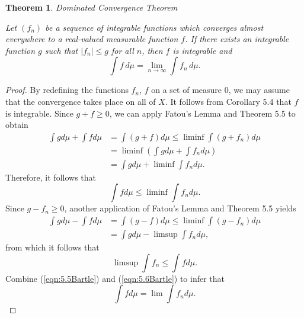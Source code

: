 \documentclass[12pt]{amsart}
\theoremstyle{plain}
\newtheorem{thm}{Theorem}[section]
\theoremstyle{definition}
\theoremstyle{remark}
\numberwithin{equation}{section}
\numberwithin{thm}{section}
\begin{document}
\begin{thm}{Dominated Convergence Theorem}

Let \((f_n)\) be a sequence of integrable functions which converges almost everywhere to a real-valued measurable function \(f\). If there exists an integrable function \(g\) such that \(|f_n| \leq g\) for all \(n\), then \(f\) is integrable and 
\[
\int f \, d\mu = \lim_{n \to \infty} \int f_n \, d\mu.
\]
\end{thm}
\begin{proof}
    By redefining the functions $f_n$, $f$ on a set of measure 0, we may assume that the convergence takes place on all of $X$. It follows from Corollary 5.4 that $f$ is integrable. Since $g+f \geq 0$, we can apply Fatou's Lemma and Theorem 5.5 to obtain
    \begin{equation*}
        \begin{aligned}
           \int g d\mu + \int f d\mu &= \int (g+f) d\mu \leq \liminf \int (g+f_n)d\mu \\
           & = \liminf(\int g d\mu + \int f_n d\mu) \\
           & = \int g d\mu + \liminf \int f_n d\mu.            
        \end{aligned}
    \end{equation*}
    Therefore, it follows that
    \begin{equation} \label{eqn:5.5Bartle}
        \int f d\mu \leq \liminf \int f_n d\mu. 
    \end{equation}
    Since $g-f_n \geq 0$, another application of Fatou's Lemma and Theorem 5.5 yields
    \begin{equation*}
        \begin{aligned}
            \int g d\mu - \int f d\mu & = \int (g-f) d\mu \leq \liminf \int (g-f_n)d\mu \\
            & = \int g d\mu - \limsup \int f_n d\mu,
        \end{aligned}
    \end{equation*}
    from which it follows that
    \begin{equation} \label{eqn:5.6Bartle}
        \limsup \int f_n \leq \int f d\mu. 
    \end{equation}
    Combine (\ref{eqn:5.5Bartle}) and (\ref{eqn:5.6Bartle}) to infer that
    \begin{equation*}
        \int f d\mu = \lim \int f_n d\mu. 
    \end{equation*}
\end{proof}
\end{document}
